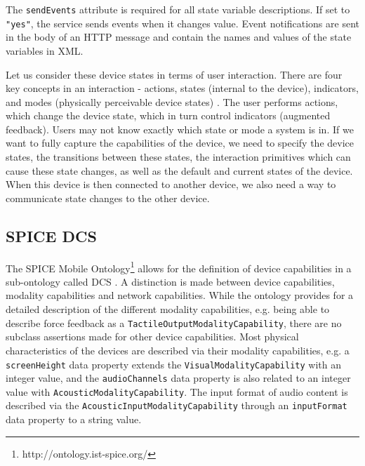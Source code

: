 The \texttt{sendEvents} attribute is required for all state variable descriptions. If set to \texttt{"yes"}, the service sends events when it changes value. Event notifications are sent in the body of an HTTP message and contain the names and values of the state variables in XML. 

Let us consider these device states in terms of user interaction. There are four key concepts in an interaction - actions, states (internal to the device), indicators, and modes (physically perceivable device states) \cite{Thimbleby2007}. The user performs actions, which change the device state, which in turn control indicators (augmented feedback). Users may not know exactly which state or mode a system is in.  If we want to fully capture the capabilities of the device, we need to specify the device states, the transitions between these states, the interaction primitives which can cause these state changes, as well as the default and current states of the device. When this device is then connected to another device, we also need a way to communicate state changes to the other device.




\subsection{SPICE DCS}
\label{spice}
The \ac{SPICE} Mobile Ontology\footnote{http://ontology.ist-spice.org/} allows for the definition of device capabilities in a sub-ontology called \ac{DCS} \cite{Villalonga2009}. A distinction is made between device capabilities, modality capabilities and network capabilities. While the ontology provides for a detailed description of the different modality capabilities, e.g. being able to describe force feedback as a \texttt{Tactile\-Output\-Modality\-Capability}, there are no subclass assertions made for other device capabilities. Most physical characteristics of the devices are described via their modality capabilities, e.g. a \texttt{screenHeight} data property extends the \texttt{VisualModalityCapability} with an integer value, and the \texttt{audio\-Channels} data property is also related to an integer value with \texttt{Acoustic\-Modality\-Capability}. The input format of audio content is described via the \texttt{AcousticInputModalityCapability} through an \texttt{inputFormat} data property to a string value.

